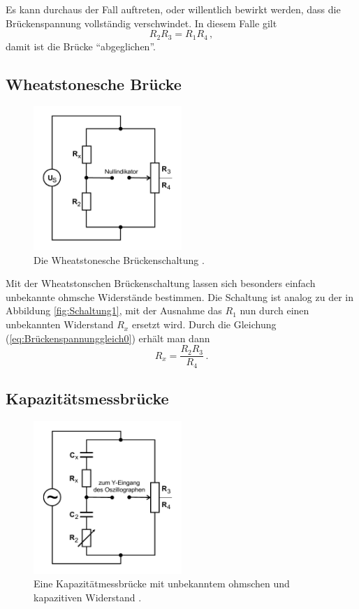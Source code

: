 Es kann durchaus der Fall auftreten, oder willentlich bewirkt werden, dass die Brückenspannung vollständig verschwindet.
In diesem Falle gilt
\begin{equation} \label{eq:Brückenspannunggleich0}
    R_2 R_3 = R_1 R_4 \, ,
\end{equation}
damit ist die Brücke \enquote{abgeglichen}.


\subsection{Wheatstonesche Brücke}

\begin{figure}
    \centering
    \includegraphics[width=0.5\textwidth]{pictures/schaltung2.pdf}
    \caption{Die Wheatstonesche Brückenschaltung \cite[4]{v302}.}
    \label{fig:Schaltung2}
\end{figure}

Mit der Wheatstonschen Brückenschaltung lassen sich besonders einfach unbekannte ohmsche Widerstände bestimmen.
Die Schaltung ist analog zu der in Abbildung \ref{fig:Schaltung1}, mit der Ausnahme das $R_1$ nun durch einen unbekannten Widerstand
$R_x$ ersetzt wird.
Durch die Gleichung (\ref{eq:Brückenspannunggleich0}) erhält man dann 
\begin{equation} \label{eq:Rx}
    R_x = \frac {R_2 R_3}{R_4} \, .
\end{equation}


\subsection{Kapazitätsmessbrücke}

\begin{figure}
    \centering
    \includegraphics[width=0.5\textwidth]{pictures/schaltung3.pdf}
    \caption{Eine Kapazitätmessbrücke mit unbekanntem ohmschen und kapazitiven Widerstand \cite[5]{v302}.}
    \label{fig:Schaltung3}
\end{figure}


